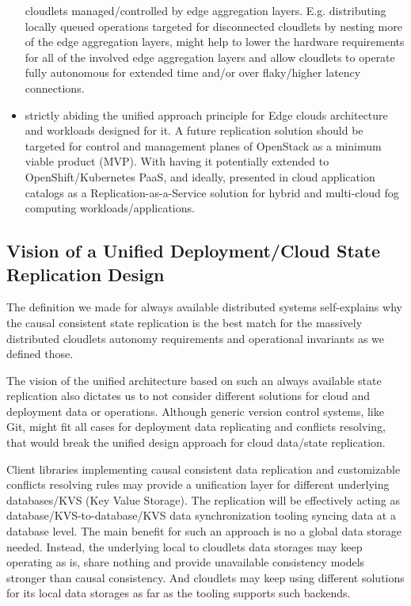 \documentclass[conference]{IEEEtran}
\begin{document}
\begin{itemize}
    cloudlets managed/controlled by edge aggregation layers. E.g. distributing
    locally queued operations targeted for disconnected cloudlets by nesting
    more of the edge aggregation layers, might help to lower the hardware
    requirements for all of the involved edge aggregation layers and allow
    cloudlets to operate fully autonomous for extended time and/or over
    flaky/higher latency connections.
  \item strictly abiding the unified approach principle for Edge clouds architecture
    and workloads designed for it. A future replication solution should be
    targeted for control and management planes of OpenStack as a minimum viable
    product (MVP). With having it potentially extended to OpenShift/Kubernetes
    PaaS, and ideally, presented in cloud application catalogs as a
    Replication-as-a-Service solution for hybrid and multi-cloud fog computing
    workloads/applications.
\end{itemize}

\subsection{Vision of a Unified Deployment/Cloud State Replication Design}

The definition we made for always available distributed systems self-explains
why the causal consistent state replication is the best match for the
massively distributed cloudlets autonomy requirements and operational
invariants as we defined those.

The vision of the unified architecture based on such an always available state
replication also dictates us to not consider different solutions for cloud and
deployment data or operations. Although generic version control systems, like
Git, might fit all cases for deployment data replicating and
conflicts resolving, that would break the unified design approach for cloud
data/state replication.

Client libraries implementing causal consistent data replication and
customizable conflicts resolving rules may provide a unification layer for
different underlying databases/KVS (Key Value Storage). The replication will be
effectively acting as database/KVS-to-database/KVS data synchronization tooling
syncing data at a database level. The main benefit for such an approach is no a
global data storage needed. Instead, the underlying local to cloudlets data
storages may keep operating as is, share nothing and provide unavailable
consistency models stronger than causal consistency. And cloudlets may keep
using different solutions for its local data storages as far as the tooling
supports such backends.
\end{document}
